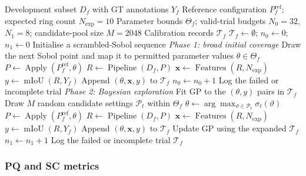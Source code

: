 \documentclass[a4paper,fleqn]{cas-dc}
\begin{document}
\begin{algorithm}[ht]
\caption{Generating calibration examples through space-filling
sampling and Bayesian exploration}
\label{alg:bo_exploration}
\begin{algorithmic}[1]
\Require Development subset $D_f$ with GT annotations $Y_f$
\Require Reference configuration $P_f^{\mathrm{ref}}$; expected ring count $N_{\mathrm{exp}}=10$
\Require Parameter bounds $\Theta_f$;
         valid-trial budgets $N_0=32$, $N_1=8$;
         candidate-pool size $M=2048$
\Ensure Calibration records $\mathcal{T}_f$
\State $\mathcal{T}_f\gets\emptyset$;
       $n_0\gets0$; $n_1\gets0$
\State Initialise a scrambled-Sobol sequence
\Statex \textit{Phase 1: broad initial coverage}
    \State Draw the next Sobol point and map it to
           permitted parameter values $\theta\in\Theta_f$
    \State $P\gets\operatorname{Apply}
           (P_f^{\mathrm{ref}},\theta)$
    \State $R\gets\operatorname{Pipeline}(D_f,P)$
        \State $\mathbf{x}\gets\operatorname{Features}(R,N_{\mathrm{exp}})$
        \State $y\gets\operatorname{mIoU}(R,Y_f)$
        \State Append $(\theta,\mathbf{x},y)$
               to $\mathcal{T}_f$
        \State $n_0\gets n_0+1$
    \Else
        \State Log the failed or incomplete trial
    \EndIf
\EndWhile
\Statex \textit{Phase 2: Bayesian exploration}
\State Fit GP to the $(\theta,y)$ pairs in $\mathcal{T}_f$
    \State Draw $M$ random candidate settings
           $\mathcal{P}_t$ within $\Theta_f$
    \State $\theta\gets
           \arg\max_{\vartheta\in\mathcal{P}_t}
           \sigma_t(\vartheta)$
    \State $P\gets\operatorname{Apply}
           (P_f^{\mathrm{ref}},\theta)$
    \State $R\gets\operatorname{Pipeline}(D_f,P)$
        \State $\mathbf{x}\gets\operatorname{Features}(R,N_{\mathrm{exp}})$
        \State $y\gets\operatorname{mIoU}(R,Y_f)$
        \State Append $(\theta,\mathbf{x},y)$
               to $\mathcal{T}_f$
        \State Update GP using the expanded $\mathcal{T}_f$
        \State $n_1\gets n_1+1$
    \Else
        \State Log the failed or incomplete trial
    \EndIf
\EndWhile
\State \Return $\mathcal{T}_f$
\end{algorithmic}
\end{algorithm}

\subsubsection{PQ and SC metrics}
\label{sec:features}
\end{document}

